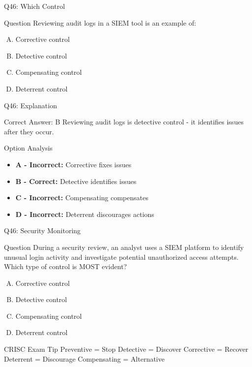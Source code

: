 \documentclass{beamer}
\begin{document}
	\begin{frame}{Q46: Which Control}
		\begin{block}{Question}
			Reviewing audit logs in a SIEM tool is an example of:
		\end{block}
		\begin{enumerate}[(A)]
			\item Corrective control
			\item Detective control
			\item Compensating control
			\item Deterrent control
		\end{enumerate}
	\end{frame}
	
	\begin{frame}{Q46: Explanation}
		\begin{block}{Correct Answer: B}
			Reviewing audit logs is detective control - it identifies issues after they occur.
		\end{block}
		\begin{block}{Option Analysis}
			\begin{itemize}
				\item \textbf{A - Incorrect:} Corrective fixes issues
				\item \textbf{B - Correct:} Detective identifies issues
				\item \textbf{C - Incorrect:} Compensating compensates
				\item \textbf{D - Incorrect:} Deterrent discourages actions
			\end{itemize}
		\end{block}
	\end{frame}
	
	
	
	
	\begin{frame}{Q46: Security Monitoring} \begin{block}{Question} During a security review, an analyst uses a SIEM platform to identify unusual login activity and investigate potential unauthorized access attempts. Which type of control is MOST evident? \end{block} \begin{enumerate}[(A)] \item Corrective control \item Detective control \item Compensating control \item Deterrent control \end{enumerate} 
	\begin{block}{CRISC Exam Tip} Preventive = Stop Detective = Discover Corrective = Recover Deterrent = Discourage Compensating = Alternative \end{block}
\end{frame}
\end{document}
